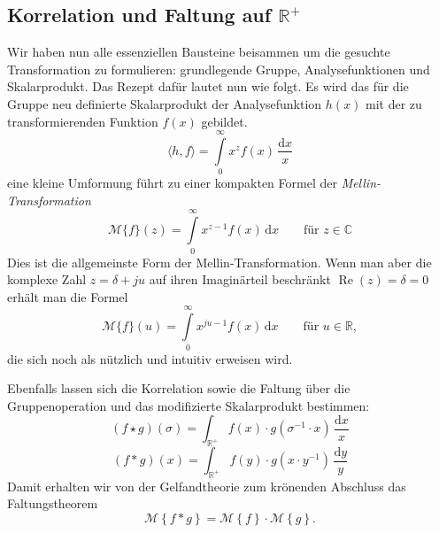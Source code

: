 \subsection{Korrelation und Faltung auf $\mathbb{R^+}$
\label{mellin:subsection:faltung}}
Wir haben nun alle essenziellen Bausteine beisammen um die gesuchte 
Transformation zu formulieren: grundlegende Gruppe, Analysefunktionen 
und Skalarprodukt.
Das Rezept dafür lautet nun wie folgt. Es wird das für die Gruppe neu 
definierte Skalarprodukt der Analysefunktion $h(x)$ mit der zu 
transformierenden Funktion $f(x)$ gebildet.
\begin{equation}
    \langle h,f \rangle 
    = \int\limits_{0}^{\infty} x^{z} f(x) \,\frac{\mathrm{d}x}{x}
\end{equation}
eine kleine Umformung führt zu einer kompakten Formel der 
\emph{Mellin-Transformation}
\begin{equation}
    \mathcal{M}\{f \}(z) 
    = \int\limits_{0}^{\infty} x^{z-1} f(x) \,\mathrm{d}x 
    \qquad\text{für $z \in \mathbb{C}$}
    \label{mellin:mellin}
\end{equation}
Dies ist die allgemeinste Form der Mellin-Transformation. 
Wenn man aber die komplexe Zahl $z = \delta + ju$ auf ihren Imaginärteil 
beschränkt $\operatorname{Re}(z) = \delta = 0$ erhält man die Formel
\begin{equation}
    \mathcal{M}\{f \}(u) 
    = \int\limits_{0}^{\infty} x^{ju-1} f(x) \,\mathrm{d}x 
    \qquad\text{für $u \in \mathbb{R}$},
    \label{mellin:mellinu}
\end{equation}
die sich noch als nützlich und intuitiv erweisen wird.

Ebenfalls lassen sich die Korrelation sowie die Faltung über die 
Gruppenoperation und das modifizierte Skalarprodukt bestimmen:
\begin{equation}
    (f \star g)(\sigma ) 
    = \int_\mathbb{R^+} 
    f(x) \cdot g(\sigma ^{-1} \cdot x)\,\frac{\mathrm{d}x}{x}
    \label{mellin:kreuzkorrelation*}
\end{equation}
\begin{equation}
    (f \ast g)(x) 
    = \int_\mathbb{R^+} 
    f(y) \cdot g(x \cdot y^{-1})\,\frac{\mathrm{d}y}{y} 
\end{equation}
Damit erhalten wir von der Gelfandtheorie zum krönenden Abschluss das 
Faltungstheorem
\begin{equation}
    \mathcal{M}\left\{f \ast g\right\} = 
    \mathcal{M}\left\{f\right\} \cdot \mathcal{M}\left\{g\right\}.
\end{equation}

